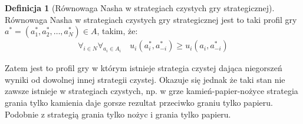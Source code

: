 \documentclass[inzynierska]{pwr_wmat_praca_dyplomowa}
\theoremstyle{plain}
\numberwithin{theorem}{chapter}
\theoremstyle{definition}
\numberwithin{theorem}{chapter}
\newtheorem{definition}[theorem]{Definicja}
\begin{document}
	\begin{definition}[Równowaga Nasha w strategiach czystych gry strategicznej]
		Równowaga Nasha w strategiach czystych gry strategicznej jest to taki profil gry $a^*= (a_1^*,a_2^*,\dots,a_N^*)\in A$, takim, że:
		\begin{align*}
			\displaystyle\mathop{\forall}_{i \in N} 
			\displaystyle\mathop{\forall}_{a_i \in A_i} \quad
			u_i(a_i^*,a_{-i}^*) \ge u_i(a_i, a_{-i}^*)
		\end{align*}
	\end{definition}
	Zatem jest to profil gry w którym istnieje strategia czystej dająca niegorszeń  wyniki od dowolnej innej strategii czystej.
	Okazuje się jednak że taki stan nie zawsze istnieje w strategiach czystych, np. w grze kamień-papier-nożyce strategia grania tylko kamienia daje gorsze rezultat przeciwko graniu tylko papieru. Podobnie z strategią grania tylko nożyc i grania tylko papieru.
\end{document}
